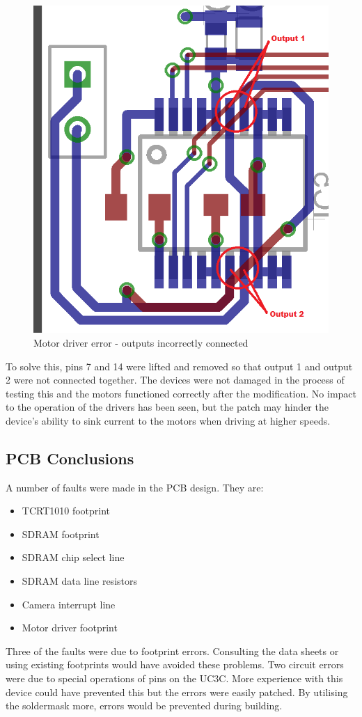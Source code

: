\begin{figure}
\centering
\includegraphics[width = \textwidth /2]{./Figures/MotorDriver_error.png}
\caption{Motor driver error - outputs incorrectly connected}
\label{fig:Motor:Error}
\end{figure}

To solve this, pins 7 and 14 were lifted and removed so that output 1 and output 2 were not connected together. The devices were not damaged in the process of testing this and the motors functioned correctly after the modification. 
No impact to the operation of the drivers has been seen, but the patch may hinder the device's ability to sink current to the motors when driving at higher speeds. 

\subsection{PCB Conclusions}
A number of faults were made in the PCB design. They are:
\begin{itemize}
\item TCRT1010 footprint
\item SDRAM footprint
\item SDRAM chip select line
\item SDRAM data line resistors
\item Camera interrupt line
\item Motor driver footprint
\end{itemize}
Three of the faults were due to footprint errors. Consulting the data sheets or using existing footprints would have avoided these problems. Two circuit errors were due to special operations of pins on the UC3C. More experience with this device could have prevented this but the errors were easily patched. By utilising the soldermask more, errors would be prevented during building. 

